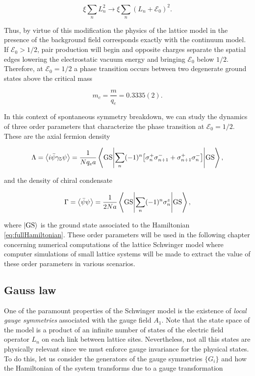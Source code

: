 \begin{equation}
\xi\sum_n L_n^2 \to  \xi\sum_n (L_n + \mathcal{E}_0)^2.
\end{equation}

Thus, by virtue of this modification the physics of the lattice model in the presence of the background field corresponds exactly with the continuum model. If $\mathcal{E}_0 >1/2$, pair production will begin and opposite charges separate the spatial edges lowering the electrostatic vacuum energy and bringing $\mathcal{E}_0$ below $1/2$. Therefore, at $\mathcal{E}_0=1/2$ a phase transition occurs between two degenerate ground states above the critical mass \cite{Byrnes2002}

\begin{equation}
    m_c = \frac{m}{q_e} = 0.3335(2).
\end{equation}

In this context of spontaneous symmetry breakdown, we can study the dynamics of three order parameters that characterize the phase transition at $\mathcal{E}_0=1/2$. These are the axial fermion density

\begin{equation}
\Lambda = \expval{i\bar\psi\gf\psi} = \frac{1}{Nq_ea}\ev**{ \sum_{n}(-1)^n  \qty[\sigma^+_n \sigma^-_{n+1}  + \sigma^+_{n+1}\sigma^-_{n}  ]}{\text{GS}},
\end{equation}

and the density of chiral condensate

\begin{equation}
\Gamma = \expval{\bar\psi\psi} = \frac{1}{2Na}\ev**{\sum_n (-1)^n \sigma^z_n }{\text{GS}},
\end{equation}

where $\ket{\text{GS}}$ is the ground state associated to the Hamiltonian \eqref{eq:fullHamiltonian}. These order parameters will be used in the following chapter concerning numerical computations of the lattice Schwinger model where computer simulations of small lattice systems will be made to extract the value of these order parameters in various scenarios.

\subsection{Gauss law}

One of the paramount properties of the Schwinger model is the existence of \emph{local gauge symmetries} associated with the gauge field $A_1$. Note that the state space of the model is a product of an infinite number of states of the electric field operator $L_n$ on each link between lattice sites. Nevertheless, not all this states are physically relevant since we must enforce gauge invariance for the physical states. To do this, let us consider the generators of the gauge symmetries $\{G_i\}$ and how the Hamiltonian of the system transforms due to a gauge transformation

